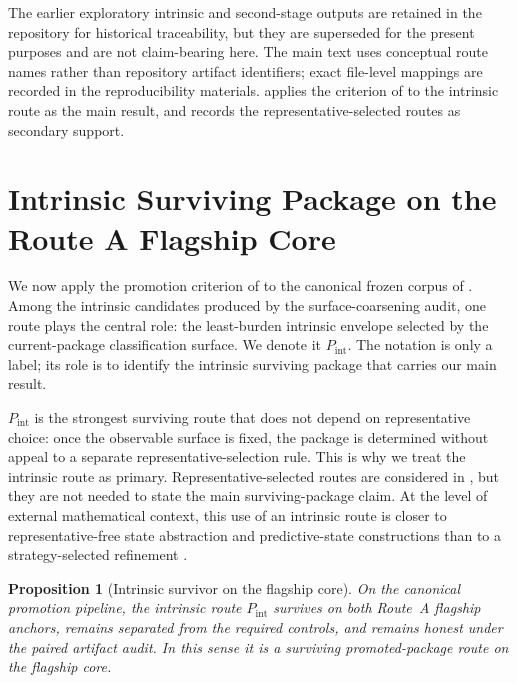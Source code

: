 \documentclass[11pt]{article}
\newtheorem{proposition}[theorem]{Proposition}
\theoremstyle{definition}
\begin{document}
The earlier exploratory intrinsic and second-stage outputs are retained in the repository for historical traceability, but they are superseded for the present purposes and are not claim-bearing here. The main text uses conceptual route names rather than repository artifact identifiers; exact file-level mappings are recorded in the reproducibility materials.  applies the criterion of  to the intrinsic route as the main result, and  records the representative-selected routes as secondary support.
 \section{Intrinsic Surviving Package on the Route A Flagship Core}\label{sec:intrinsic}

We now apply the promotion criterion of  to the canonical frozen corpus of . Among the intrinsic candidates produced by the surface-coarsening audit, one route plays the central role: the least-burden intrinsic envelope selected by the current-package classification surface. We denote it $P_{\mathrm{int}}$. The notation is only a label; its role is to identify the intrinsic surviving package that carries our main result.

$P_{\mathrm{int}}$ is the strongest surviving route that does not depend on representative choice: once the observable surface is fixed, the package is determined without appeal to a separate representative-selection rule. This is why we treat the intrinsic route as primary. Representative-selected routes are considered in , but they are not needed to state the main surviving-package claim. At the level of external mathematical context, this use of an intrinsic route is closer to representative-free state abstraction and predictive-state constructions than to a strategy-selected refinement \citep{GivanDeanGreig2003,LiWalshLittman2006,LittmanSuttonSingh2001,Jaeger2000}.

\begin{proposition}[Intrinsic survivor on the flagship core]\label{prop:intrinsic-main-result}
On the canonical promotion pipeline, the intrinsic route $P_{\mathrm{int}}$ survives on both Route~A flagship anchors, remains separated from the required controls, and remains honest under the paired artifact audit. In this sense it is a surviving promoted-package route on the flagship core.
\end{proposition}
\end{document}
